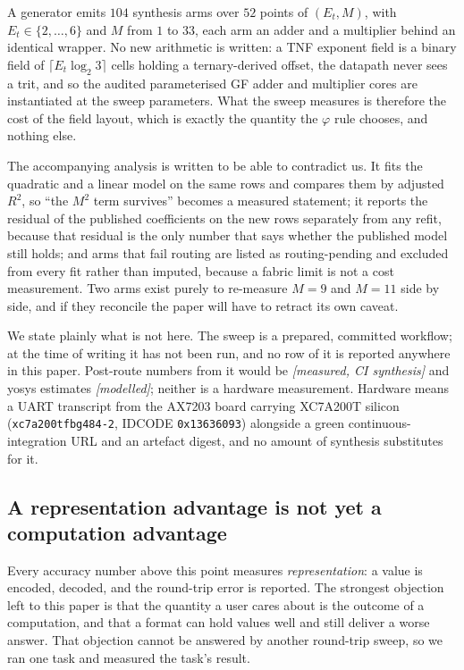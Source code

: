\documentclass[11pt]{article}
\theoremstyle{definition}
\begin{document}
A generator emits $104$ synthesis arms over $52$ points of $(E_t, M)$, with
$E_t \in \{2,\dots,6\}$ and $M$ from $1$ to $33$, each arm an adder and a
multiplier behind an identical wrapper. No new arithmetic is written: a TNF
exponent field is a binary field of $\lceil E_t \log_2 3 \rceil$ cells holding a
ternary-derived offset, the datapath never sees a trit, and so the audited
parameterised GF adder and multiplier cores are instantiated at the sweep
parameters. What the sweep measures is therefore the cost of the field layout,
which is exactly the quantity the $\varphi$ rule chooses, and nothing else.

The accompanying analysis is written to be able to contradict us. It fits the
quadratic and a linear model on the same rows and compares them by adjusted
$R^2$, so ``the $M^2$ term survives'' becomes a measured statement; it reports the
residual of the published coefficients on the new rows separately from any refit,
because that residual is the only number that says whether the published model
still holds; and arms that fail routing are listed as routing-pending and
excluded from every fit rather than imputed, because a fabric limit is not a cost
measurement. Two arms exist purely to re-measure $M = 9$ and $M = 11$ side by side,
and if they reconcile the paper will have to retract its own caveat.

We state plainly what is not here. The sweep is a prepared, committed workflow;
at the time of writing it has not been run, and no row of it is reported anywhere
in this paper. Post-route numbers from it would be \emph{[measured, CI synthesis]}
and yosys estimates \emph{[modelled]}; neither is a hardware measurement. Hardware
means a UART transcript from the AX7203 board carrying XC7A200T silicon
(\texttt{xc7a200tfbg484-2}, IDCODE \texttt{0x13636093}) alongside a green
continuous-integration URL and an artefact digest, and no amount of synthesis
substitutes for it.

\subsection{A representation advantage is not yet a computation advantage}
\label{sec:downstream}

Every accuracy number above this point measures \emph{representation}: a value is
encoded, decoded, and the round-trip error is reported. The strongest objection
left to this paper is that the quantity a user cares about is the outcome of a
computation, and that a format can hold values well and still deliver a worse
answer. That objection cannot be answered by another round-trip sweep, so we ran
one task and measured the task's result.
\end{document}
